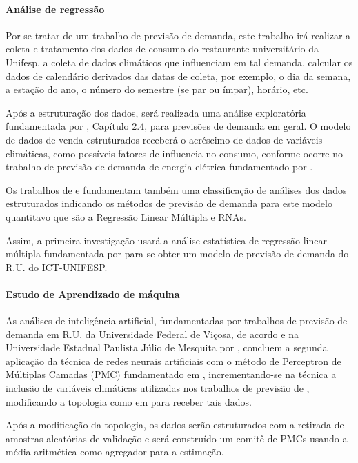 \documentclass[	12pt, Times, openright, twoside, a4paper, english, brazil]{abntex2}
\begin{document}
        \paragraph*{Análise de regressão}

          Por se tratar de um trabalho de previsão de demanda,  este trabalho irá realizar a coleta e tratamento dos dados de consumo do restaurante universitário da Unifesp, a coleta de dados climáticos que influenciam em tal demanda, calcular os dados de calendário derivados das datas de coleta, por exemplo, o dia da semana, a estação do ano, o número do semestre (se par ou ímpar), horário, etc.

          Após a estruturação dos dados, será realizada uma análise exploratória fundamentada por \cite{Junior2007}, Capítulo 2.4, para previsões de demanda em geral.
          O modelo de dados de venda estruturados receberá o acréscimo de dados de variáveis climáticas, como possíveis fatores de influencia no consumo, conforme ocorre no trabalho de previsão de demanda de energia elétrica fundamentado por \cite{Almeida2013,RUAS2012,Silva2010}.

          Os trabalhos de \cite{Junior2007} e \cite{Silva2010} fundamentam também uma classificação de análises dos dados estruturados indicando os métodos de previsão de demanda para este modelo quantitavo que são a Regressão Linear Múltipla e RNAs.

          Assim, a primeira investigação usará a análise estatística de regressão linear múltipla fundamentada por \cite{Clarice2011} para se obter um modelo de previsão de demanda do R.U. do ICT-UNIFESP.

        \paragraph*{Estudo de Aprendizado de máquina}
          As análises de inteligência artificial, fundamentadas por trabalhos de previsão de demanda em R.U. da Universidade Federal de Viçosa, de acordo \cite{Lopes2008} e na Universidade Estadual Paulista Júlio de Mesquita por \cite{Rocha2011}, concluem a segunda aplicação da técnica de redes neurais artificiais com o método de Perceptron de Múltiplas Camadas (PMC) fundamentado em \cite{Haykin1994}, incrementando-se na técnica a inclusão de variáveis climáticas utilizadas nos trabalhos de previsão de  \cite{Almeida2013, RUAS2012, Silva2010}, modificando a topologia como em \cite{Lopes2008} para receber tais dados. 

          Após a modificação da topologia, os dados serão estruturados com a retirada de amostras aleatórias de validação e será construído um comitê de PMCs usando a média aritmética como agregador para a estimação.
\end{document}
